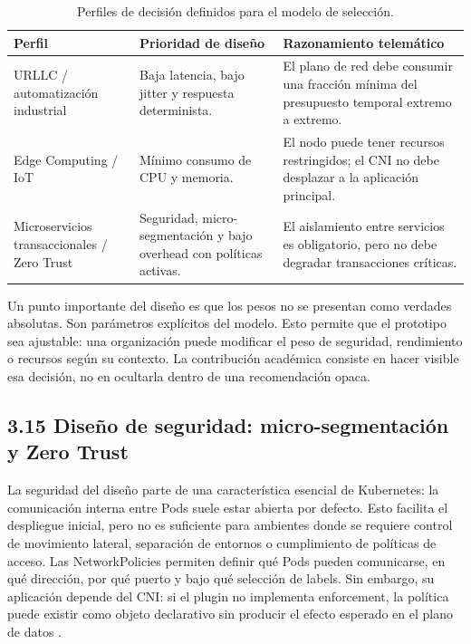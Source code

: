 \begin{table}[htbp]
\centering
\scriptsize
\caption{Perfiles de decisión definidos para el modelo de selección.}
\label{tab:perfiles-decision}
\begin{tabularx}{\textwidth}{|Y|Y|Y|}
\hline
\textbf{Perfil} & \textbf{Prioridad de diseño} & \textbf{Razonamiento telemático} \\
\hline
URLLC / automatización industrial & Baja latencia, bajo jitter y respuesta determinista. & El plano de red debe consumir una fracción mínima del presupuesto temporal extremo a extremo. \\
\hline
Edge Computing / IoT & Mínimo consumo de CPU y memoria. & El nodo puede tener recursos restringidos; el CNI no debe desplazar a la aplicación principal. \\
\hline
Microservicios transaccionales / Zero Trust & Seguridad, micro-segmentación y bajo overhead con políticas activas. & El aislamiento entre servicios es obligatorio, pero no debe degradar transacciones críticas. \\
\hline
\end{tabularx}
\end{table}

Un punto importante del diseño es que los pesos no se presentan como verdades absolutas. Son parámetros explícitos del modelo. Esto permite que el prototipo sea ajustable: una organización puede modificar el peso de seguridad, rendimiento o recursos según su contexto. La contribución académica consiste en hacer visible esa decisión, no en ocultarla dentro de una recomendación opaca.

\subsection{3.15 Diseño de seguridad: micro-segmentación y Zero Trust}

La seguridad del diseño parte de una característica esencial de Kubernetes: la comunicación interna entre Pods suele estar abierta por defecto. Esto facilita el despliegue inicial, pero no es suficiente para ambientes donde se requiere control de movimiento lateral, separación de entornos o cumplimiento de políticas de acceso. Las NetworkPolicies permiten definir qué Pods pueden comunicarse, en qué dirección, por qué puerto y bajo qué selección de labels. Sin embargo, su aplicación depende del CNI: si el plugin no implementa enforcement, la política puede existir como objeto declarativo sin producir el efecto esperado en el plano de datos \cite{ref4,ref18}.

